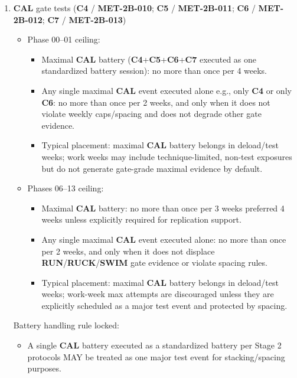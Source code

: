 \documentclass[10pt]{article}
\begin{document}
\begin{enumerate}
\item \textbf{CAL} gate tests (\textbf{C4} / \textbf{MET-2B-010}; \textbf{C5} / \textbf{MET-2B-011}; \textbf{C6} / \textbf{MET-2B-012}; \textbf{C7} / \textbf{MET-2B-013})

\begin{itemize}
\item Phase 00–01 ceiling:
  \begin{itemize}
  \item Maximal \textbf{CAL} battery (\textbf{C4}+\textbf{C5}+\textbf{C6}+\textbf{C7} executed as one standardized battery session): no more than once per 4 weeks.
  \item Any single maximal \textbf{CAL} event executed alone e.g., only \textbf{C4} or only \textbf{C6}: no more than once per 2 weeks, and only when it does not violate weekly caps/spacing and does not degrade other gate evidence.
  \item Typical placement: maximal \textbf{CAL} battery belongs in deload/test weeks; work weeks may include technique-limited, non-test exposures but do not generate gate-grade maximal evidence by default.
  \end{itemize}
\item Phases 06–13 ceiling:
  \begin{itemize}
  \item Maximal \textbf{CAL} battery: no more than once per 3 weeks preferred 4 weeks unless explicitly required for replication support.
  \item Any single maximal \textbf{CAL} event executed alone: no more than once per 2 weeks, and only when it does not displace \textbf{RUN}/\textbf{RUCK}/\textbf{SWIM} gate evidence or violate spacing rules.
  \item Typical placement: maximal \textbf{CAL} battery belongs in deload/test weeks; work-week max attempts are discouraged unless they are explicitly scheduled as a major test event and protected by spacing.
  \end{itemize}
\end{itemize}

Battery handling rule locked:

\begin{itemize}
\item A single \textbf{CAL} battery executed as a standardized battery per Stage 2 protocols MAY be treated as one major test event for stacking/spacing purposes.
\end{itemize}


\end{enumerate}
\end{document}
